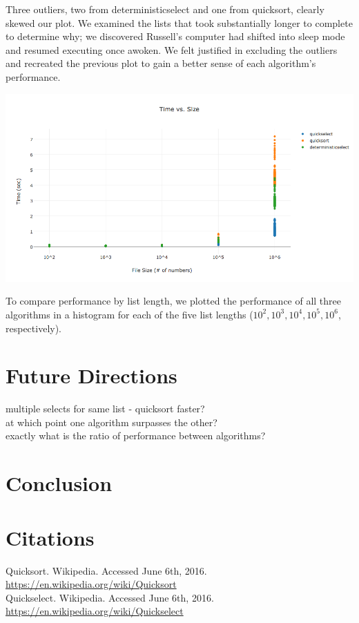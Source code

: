 \documentclass{article}
\begin{document}
Three outliers, two from deterministicselect and one from quicksort, clearly skewed our plot. We examined the lists that took substantially longer to complete to determine why; we discovered Russell's computer had shifted into sleep mode and resumed executing once awoken. We felt justified in excluding the outliers and recreated the previous plot to gain a better sense of each algorithm's performance.

\includegraphics[scale=.45]{results}

To compare performance by list length, we plotted the performance of all three algorithms in a histogram for each of the five list lengths ($10^2, 10^3, 10^4, 10^5, 10^6$, respectively).

\section*{Future Directions}
multiple selects for same list - quicksort faster?\\

at which point one algorithm surpasses the other?\\

exactly what is the ratio of performance between algorithms?

\section*{Conclusion}

\section*{Citations}
Quicksort. Wikipedia. Accessed June 6th, 2016. \url{https://en.wikipedia.org/wiki/Quicksort}\\

\noindent Quickselect. Wikipedia. Accessed June 6th, 2016. \url{https://en.wikipedia.org/wiki/Quickselect}\\
\end{document}
